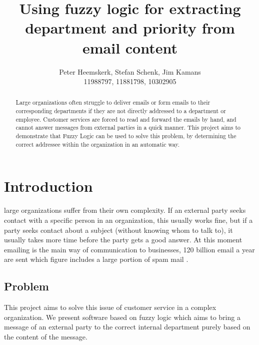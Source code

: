 \documentclass[journal]{IEEEtran}
\begin{document}
\title{Using fuzzy logic for extracting department and priority from email content}
\author{Peter Heemskerk, Stefan Schenk, Jim Kamans\\11988797, 11881798, 10302905}


\maketitle

\begin{abstract}
Large organizations often struggle to deliver emails or form emails to their corresponding departments if they are not directly addressed to a department or employee. Customer services are forced to read and forward the emails by hand, and cannot answer messages from external parties in a quick manner. This project aims to demonstrate that Fuzzy Logic can be used to solve this problem, by determining the correct addressee within the organization in an automatic way.

\end{abstract}

\section{Introduction}
 large organizations suffer from their own complexity. If an external party seeks contact with a specific person in an organization, this usually works fine, but if a party seeks contact about a subject (without knowing whom to talk to), it usually takes more time before the party gets a good answer. At this moment emailing is the main way of communication to businesses, 120 billion email a year are sent which figure includes a large portion of spam mail \cite{email_statistics}.\\

\subsection{Problem}

This project aims to solve this issue of customer service in a complex organization. We present software based on fuzzy logic which aims to bring a message of an external party to the correct internal department purely based on the content of the message.
\end{document}
